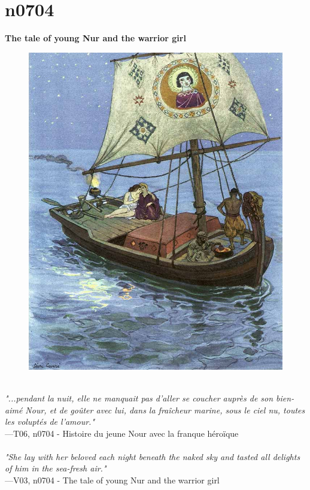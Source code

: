 \documentclass[../Carre_nights.tex]{subfiles}
\begin{document}
\section{n0704}
\textbf{\Large{The tale of young Nur and the warrior girl}} \\

\begin{figure}[ht]
\centering
\includegraphics[height=\figsize]{illustrations/volume_6/T06, n0704 - Histoire du jeune Nour avec la franque héroïque.jpg}
\end{figure}

\textit{\\
"...pendant la nuit, elle ne manquait pas d’aller se coucher auprès de son bien-aimé Nour, et de goûter avec lui, dans la fraîcheur marine, sous le ciel nu, toutes les voluptés de l’amour."} \\
—T06, n0704 - Histoire du jeune Nour avec la franque héroïque \\~\\
\textit{"She lay with her beloved each night beneath the naked sky and tasted all delights of him in the sea-fresh air."} \\
—V03, n0704 - The tale of young Nur and the warrior girl
\end{document}
